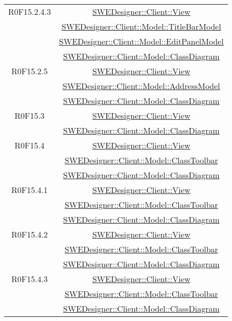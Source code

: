 \documentclass[../SpecificaTecnica.tex]{subfiles}
\begin{document}
\begin{longtable}{|c|c|}
		R0F15.2.4.3 & \hyperlink{SWEDesigner::Client::View}{SWEDesigner::Client::View}\\& \hyperlink{SWEDesigner::Client::Model::TitleBarModel}{SWEDesigner::Client::Model::TitleBarModel}\\& \hyperlink{SWEDesigner::Client::Model::EditPanelModel}{SWEDesigner::Client::Model::EditPanelModel}\\& \hyperlink{SWEDesigner::Client::Model::ClassDiagram}{SWEDesigner::Client::Model::ClassDiagram}\\\hline
		R0F15.2.5 & \hyperlink{SWEDesigner::Client::View}{SWEDesigner::Client::View}\\& \hyperlink{SWEDesigner::Client::Model::AddressModel}{SWEDesigner::Client::Model::AddressModel}\\& \hyperlink{SWEDesigner::Client::Model::ClassDiagram}{SWEDesigner::Client::Model::ClassDiagram}\\\hline
		R0F15.3 & \hyperlink{SWEDesigner::Client::View}{SWEDesigner::Client::View}\\& \hyperlink{SWEDesigner::Client::Model::ClassDiagram}{SWEDesigner::Client::Model::ClassDiagram}\\\hline
		R0F15.4 & \hyperlink{SWEDesigner::Client::View}{SWEDesigner::Client::View}\\& \hyperlink{SWEDesigner::Client::Model::ClassToolbar}{SWEDesigner::Client::Model::ClassToolbar}\\& \hyperlink{SWEDesigner::Client::Model::ClassDiagram}{SWEDesigner::Client::Model::ClassDiagram}\\\hline
		R0F15.4.1 & \hyperlink{SWEDesigner::Client::View}{SWEDesigner::Client::View}\\& \hyperlink{SWEDesigner::Client::Model::ClassToolbar}{SWEDesigner::Client::Model::ClassToolbar}\\& \hyperlink{SWEDesigner::Client::Model::ClassDiagram}{SWEDesigner::Client::Model::ClassDiagram}\\\hline
		R0F15.4.2 & \hyperlink{SWEDesigner::Client::View}{SWEDesigner::Client::View}\\& \hyperlink{SWEDesigner::Client::Model::ClassToolbar}{SWEDesigner::Client::Model::ClassToolbar}\\& \hyperlink{SWEDesigner::Client::Model::ClassDiagram}{SWEDesigner::Client::Model::ClassDiagram}\\\hline
		R0F15.4.3 & \hyperlink{SWEDesigner::Client::View}{SWEDesigner::Client::View}\\& \hyperlink{SWEDesigner::Client::Model::ClassToolbar}{SWEDesigner::Client::Model::ClassToolbar}\\& \hyperlink{SWEDesigner::Client::Model::ClassDiagram}{SWEDesigner::Client::Model::ClassDiagram}\\\hline

\end{longtable}
\end{document}
